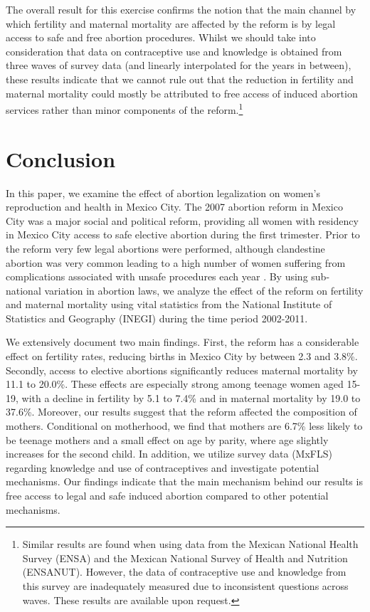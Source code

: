 \documentclass[a4paper, 11pt]{article}
\begin{document}
\begin{spacing}{2}
The overall result for this exercise confirms the notion that the main channel by which fertility and maternal mortality are affected by the reform is by legal access to safe and free abortion procedures. Whilst we should take into consideration that data on contraceptive use and knowledge is obtained from three waves of survey data (and linearly interpolated for the years in between), these results indicate that we cannot rule out that the reduction in fertility and maternal mortality could mostly be attributed to free access of induced abortion services rather than minor components of the reform.\footnote{Similar results are found when using data from the Mexican National Health Survey (ENSA) and the Mexican National Survey of Health and Nutrition (ENSANUT). However, the data of contraceptive use and knowledge from this survey are inadequately measured due to inconsistent questions across waves. These results are available upon request.}

    

 
 
\section{Conclusion}\label{Conclusion}
In this paper, we examine the effect of abortion legalization on women's reproduction and health in Mexico City. The 2007 abortion reform in Mexico City was a major social and political reform, providing all women with residency in Mexico City access to safe elective abortion during the first trimester. Prior to the reform very few legal abortions were performed, although clandestine abortion was very common \citep{Becker} leading to a high number of women suffering from complications associated with unsafe procedures each year \citep{GIRE2009}. By using sub-national variation in abortion laws, we analyze the effect of the reform on fertility and maternal mortality using vital statistics from the National Institute of Statistics and Geography (INEGI) during the time period 2002-2011. 

We extensively document two main findings. First, the reform has a considerable effect on fertility rates, reducing births in Mexico City by between 2.3 and 3.8\%. Secondly, access to elective abortions significantly reduces maternal mortality by 11.1 to 20.0\%. These effects are especially strong among teenage women aged 15-19, with a decline in fertility by 5.1 to 7.4\% and in maternal mortality by 19.0 to 37.6\%. Moreover, our results suggest that the reform affected the composition of mothers. Conditional on motherhood, we find that mothers are 6.7\% less likely to be teenage mothers and a small effect on age by parity, where age slightly increases for the second child. In addition, we utilize survey data (MxFLS) regarding knowledge and use of contraceptives and investigate potential mechanisms. Our findings indicate that the main mechanism behind our results is free access to legal and safe induced abortion compared to other potential mechanisms.
 

\end{spacing}
\end{document}
